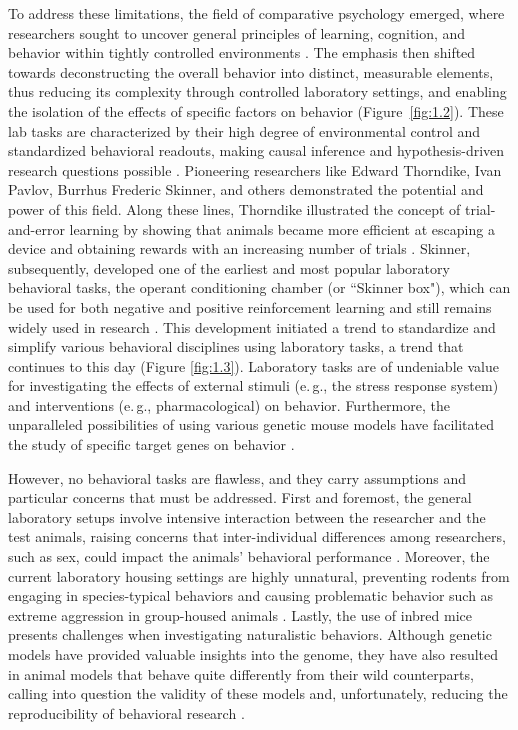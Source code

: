 To address these limitations, the field of comparative psychology emerged, where researchers sought to uncover general principles of learning, cognition, and behavior within tightly controlled environments \cite{Scott1967ComparativeEthology}. The emphasis then shifted towards deconstructing the overall behavior into distinct, measurable elements, thus reducing its complexity through controlled laboratory settings, and enabling the isolation of the effects of specific factors on behavior (Figure~\ref{fig:1.2}). These lab tasks are characterized by their high degree of environmental control and standardized behavioral readouts, making causal inference and hypothesis-driven research questions possible \cite{Dettmer2021100Requires}. Pioneering researchers like Edward Thorndike, Ivan Pavlov, Burrhus Frederic Skinner, and others demonstrated the potential and power of this field. Along these lines, Thorndike illustrated the concept of trial-and-error learning by showing that animals became more efficient at escaping a device and obtaining rewards with an increasing number of trials \cite{Thorndike1898AnimalAnimals.}. Skinner, subsequently, developed one of the earliest and most popular laboratory behavioral tasks, the operant conditioning chamber (or ``Skinner box"), which can be used for both negative and positive reinforcement learning and still remains widely used in research \cite{Skinner1948SuperstitionPigeon}. This development initiated a trend to standardize and simplify various behavioral disciplines using laboratory tasks, a trend that continues to this day (Figure \ref{fig:1.3}). Laboratory tasks are of undeniable value for investigating the effects of external stimuli (e.\,g., the stress response system) and interventions (e.\,g., pharmacological) on behavior. Furthermore, the unparalleled possibilities of using various genetic mouse models have facilitated the study of specific target genes on behavior \cite{Baker2020RodentPromises}.

However, no behavioral tasks are flawless, and they carry assumptions and particular concerns that must be addressed. First and foremost, the general laboratory setups involve intensive interaction between the researcher and the test animals, raising concerns that inter-individual differences among researchers, such as sex, could impact the animals' behavioral performance \cite{Georgiou2022ExperimentersFactor, Chesler2002InfluencesBehavior, Sorge2014OlfactoryRodents}. Moreover, the current laboratory housing settings are highly unnatural, preventing rodents from engaging in species-typical behaviors and causing problematic behavior such as extreme aggression in group-housed animals \cite{Weber2017AggressionProblem}. Lastly, the use of inbred mice presents challenges when investigating naturalistic behaviors. Although genetic models have provided valuable insights into the genome, they have also resulted in animal models that behave quite differently from their wild counterparts, calling into question the validity of these models and, unfortunately, reducing the reproducibility of behavioral research \cite{Soderlund2018RelevanceNeuropsychiatry}.

